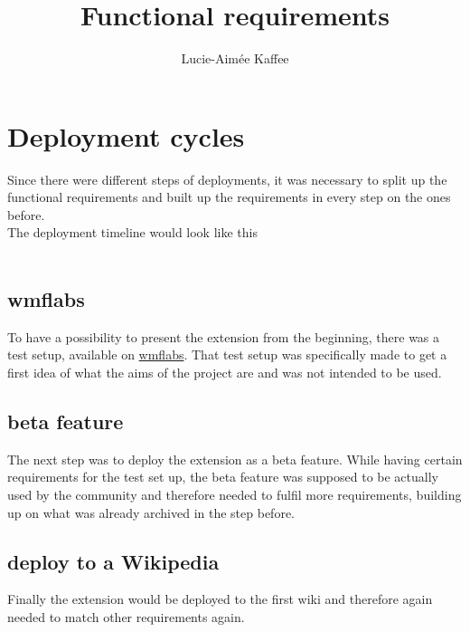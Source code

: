 \documentclass[11pt]{article}
\title {{Functional requirements}}
\author {Lucie-Aim\'{e}e Kaffee}
\date{}
\begin{document}
\section{Deployment cycles}
Since there were different steps of deployments, it was necessary to split up the functional requirements and built up the requirements in every step on the ones before. \\
The deployment timeline would look like this
\\ 
\\

\subsection{wmflabs}
To have a possibility to present the extension from the beginning, there was a test setup, available on \href{articleplaceholder.wmflabs.org/mediawiki}{wmflabs}. That test setup was specifically made to get a first idea of what the aims of the project are and was not intended to be used. 

\subsection{beta feature}
The next step was to deploy the extension as a beta feature. While having certain requirements for the test set up, the beta feature was supposed to be actually used by the community and therefore needed to fulfil more requirements, building up on what was already archived in the step before. 

\subsection{deploy to a Wikipedia}
Finally the extension would be deployed to the first wiki and therefore again needed to match other requirements again. 


 
\end{document}
